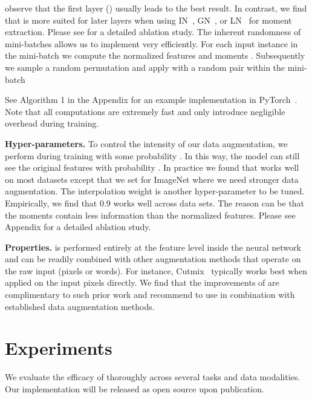 \documentclass[final]{cvpr}
\begin{document}
observe that the first layer () usually leads to the best result. In contrast, we find that \methodname{} is more suited for later layers when using IN~\citep{ulyanov2016instance}, GN~\citep{wu2018group}, or LN~\citep{ba2016layer} for moment extraction. 
Please see  for a detailed ablation study. 
The inherent randomness of mini-batches allows us to implement \methodname{} very efficiently. For each input instance in the mini-batch  we compute the normalized features and moments  . Subsequently we sample a random permutation  and apply \methodname{} with a random pair within the mini-batch

See Algorithm 1 in the Appendix for an example implementation in PyTorch~\citep{paszke2017automatic}. Note that all computations are extremely fast and only introduce negligible overhead during training. 


\textbf{Hyper-parameters.}
To control the intensity of our data augmentation, we perform \methodname{} during training with some probability . In this way, the model can still see the original features with probability . In practice we found that  works well on most datasets except that we set  for ImageNet where we need stronger data augmentation.
The interpolation weight  is another hyper-parameter to be tuned. Empirically, we find that 0.9 works well across data sets. The reason can be that the moments contain less information than the normalized features.
Please see Appendix for a detailed ablation study. 


\textbf{Properties.} \methodname{} is performed entirely at the feature level inside the neural network and can be readily combined with other augmentation methods that operate on the raw input (pixels or words). For instance,  Cutmix~\cite{yun2019cutmix} typically works best when applied on the input pixels directly. We find that the improvements of \methodname{} are complimentary to such prior work and recommend to use \methodname{} in combination with established data augmentation methods. 

\vspace{-0.1in}



 \section{Experiments}
\label{sec:exp}

We evaluate the efficacy of \methodname{} thoroughly across several tasks and data modalities. Our implementation will be released as open source upon publication. 
\end{document}
